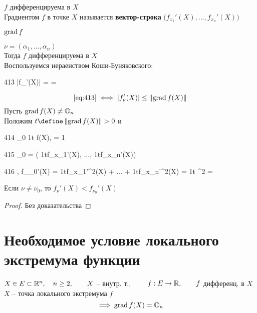 \begin{definition}
	$ f $ дифференцируема в $ X $ \\
	Градиентом $ f $ в точке $ X $ называется \textbf{вектор-строка} $ \big( f_{x_1}'(X), ..., f_{x_n}'(X) \big) $
\end{definition}

\begin{notation}
	$ \operatorname{grad} f $
\end{notation}

\begin{statement}
	$ \nu = (\alpha_1, ..., \alpha_n) $ \\
	Тогда $ f $ дифференцируема в $ X $ \\
	Воспользуемся нераенством Коши-Буняковского:
	\begin{equ}{413}
		|f_\nu'(X)| =  \cdot {} = 
	\end{equ}
	$$ \eref{413} \iff |f_\nu'(X)| \le \norm{\grad f(X)} $$
	Пусть $ \operatorname{grad} f(X) \ne \mathbb{O}_{n} $ \\
	Положим $ t \define \norm{\grad f(X)} > 0 $ и
	\begin{equ}{414}
		\nu_0  \dfrac1t \grad f(X), \qquad {} = 1
	\end{equ}
	\begin{equ}{415}
		 \implies \nu_0 = \bigg( \frac1tf_{x_1}'(X), ..., \frac1tf_{x_n}'(X))
	\end{equ}
	\begin{equ}{416}
		,  \implies f_{\nu_0}'(X) = \frac1tf_{x_1}'^2(X) + ... + \frac1tf_{x_n}'^2(X) = \frac1t ^2 = 
	\end{equ}
	\begin{statement}
		Если $ \nu \ne \nu_0 $, то $ f_\nu'(X) < f_{\nu_0}'(X) $
	\end{statement}
	\begin{proof}
		Без доказательства
	\end{proof}
\end{statement}

\section{Необходимое условие локального экстремума функции}

\begin{theorem}
	$ X \in E \subset \mathbb{R}^n, \quad n \ge 2, \qquad X $ -- внутр. т., $ \qquad f : E \to \mathbb{R}, \qquad f $ дифференц. в $ X $ \\
	$ X $ -- точка локального экстремума $ f $
	$$ \implies \operatorname{grad} f(X) = \mathbb{O}_{n} $$
\end{theorem}

